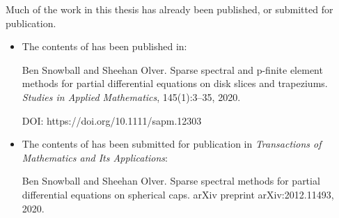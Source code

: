 

\begin{foreword}

Much of the work in this thesis has already been published, or submitted for publication.

\begin{itemize}

\item The contents of  has been published in:

Ben Snowball and Sheehan Olver. Sparse spectral and p-finite element methods for partial differential equations on disk slices and trapeziums. \textit{Studies in Applied Mathematics}, 145(1):3--35, 2020. 

DOI: https://doi.org/10.1111/sapm.12303

\item The contents of  has been submitted for publication in \textit{Transactions of Mathematics and Its Applications}:

Ben Snowball and Sheehan Olver. Sparse spectral methods for partial differential equations on spherical caps. arXiv preprint arXiv:2012.11493, 2020.

\end{itemize}

\end{foreword}
